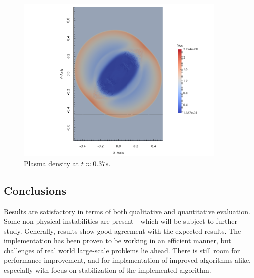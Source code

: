 \begin{figure}[H]
    \vspace{-5mm}
    \begin{center}
        \includegraphics[width=0.9\textwidth]{img/density-21.png}
    \end{center} 
    \vspace{-10mm}
    \caption{Plasma density at $t \approx 0.37s$.}
\end{figure} 


\subsection{Conclusions}
Results are satisfactory in terms of both qualitative and quantitative evaluation. Some non-physical instabilities are present - which will be subject to further study. Generally, results show good agreement with the expected results. The implementation has been proven to be working in an efficient manner, but challenges of real world large-scale problems lie ahead. There is still room for performance improvement, and for implementation of improved algorithms alike, especially with focus on stabilization of the implemented algorithm.